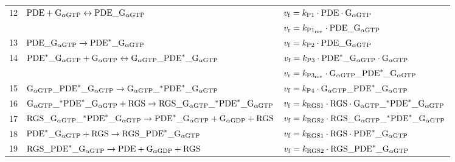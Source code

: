 \documentclass[a4paper, 12pt]{book}
\begin{document}
\begin{table}[H]
\begin{tabular}{c | l | l}
\hline
12 & ${\rm PDE} + {\rm G}_{\alpha{\rm GTP}} \leftrightarrow {\rm PDE}\_{\rm G}_{\alpha{\rm GTP}}$ & $v_{\rm f} = k_{\rm P1} \cdot {\rm PDE} \cdot {\rm G}_{\alpha{\rm GTP}}$\\
 & & $v_{\rm r} = k_{\rm P1_{rev}} \cdot {\rm PDE}\_{\rm G}_{\alpha{\rm GTP}} $\\
\hline
13 & $ {\rm PDE}\_{\rm G}_{\alpha{\rm GTP}} \rightarrow {\rm PDE}^{*}\_{\rm G}_{\alpha{\rm GTP}} $ & $v_{\rm f} =  k_{\rm P2} \cdot {\rm PDE}\_{\rm G}_{\alpha{\rm GTP}}$\\
\hline
14 & $ {\rm PDE}^{*}\_{\rm G}_{\alpha{\rm GTP}} + {\rm G}_{\alpha{\rm GTP}} \leftrightarrow {\rm G}_{\alpha{\rm GTP}}\_{\rm PDE}^{*}\_{\rm G}_{\alpha{\rm GTP}}$ & $v_{\rm f} =  k_{\rm P3} \cdot {\rm PDE}^{*}\_{\rm G}_{\alpha{\rm GTP}} \cdot {\rm G}_{\alpha{\rm GTP}} $\\
 & & $v_{\rm r} = k_{\rm P3_{rev}} \cdot {\rm G}_{\alpha{\rm GTP}}\_{\rm PDE}^{*}\_{\rm G}_{\alpha{\rm GTP}} $\\
\hline
15 & $ {\rm G}_{\alpha{\rm GTP}}\_{\rm PDE}^{*}\_{\rm G}_{\alpha{\rm GTP}} \rightarrow {\rm G}_{\alpha{\rm GTP}}\_{\rm {}^{*} PDE}^{*}\_{\rm G}_{\alpha{\rm GTP}}$ & $v_{\rm f} =  k_{\rm P4} \cdot {\rm G}_{\alpha{\rm GTP}}\_{\rm PDE}^{*}\_{\rm G}_{\alpha{\rm GTP}} $\\
\hline
16 & ${\rm G}_{\alpha{\rm GTP}}\_{\rm {}^{*} PDE}^{*}\_{\rm G}_{\alpha{\rm GTP}} + {\rm RGS} \rightarrow {\rm RGS}\_{\rm G}_{\alpha{\rm GTP}}\_{\rm {}^{*} PDE}^{*}\_{\rm G}_{\alpha{\rm GTP}}$ & $v_{\rm f} =  k_{\rm RGS1} \cdot {\rm RGS} \cdot {\rm G}_{\alpha{\rm GTP}}\_{\rm {}^{*} PDE}^{*}\_{\rm G}_{\alpha{\rm GTP}} $\\
\hline
17 & ${\rm RGS}\_{\rm G}_{\alpha{\rm GTP}}\_{\rm {}^{*} PDE}^{*}\_{\rm G}_{\alpha{\rm GTP}} \rightarrow {\rm PDE}^{*}\_{\rm G}_{\alpha{\rm GTP}} + {\rm G}_{\alpha{\rm GDP}} + {\rm RGS} $ & $v_{\rm f} =  k_{\rm RGS2} \cdot {\rm RGS}\_{\rm G}_{\alpha{\rm GTP}}\_{\rm {}^{*} PDE}^{*}\_{\rm G}_{\alpha{\rm GTP}} $\\
\hline
18 & ${\rm PDE}^{*}\_{\rm G}_{\alpha{\rm GTP}} + {\rm RGS} \rightarrow {\rm RGS}\_{\rm PDE}^{*}\_{\rm G}_{\alpha{\rm GTP}}$ & $v_{\rm f} =  k_{\rm RGS1} \cdot {\rm RGS} \cdot {\rm PDE}^{*}\_{\rm G}_{\alpha{\rm GTP}} $\\
\hline
19 & ${\rm RGS}\_{\rm PDE}^{*}\_{\rm G}_{\alpha{\rm GTP}} \rightarrow {\rm PDE} + {\rm G}_{\alpha{\rm GDP}} + {\rm RGS} $ & $v_{\rm f} =  k_{\rm RGS2} \cdot {\rm RGS}\_{\rm PDE}^{*}\_{\rm G}_{\alpha{\rm GTP}} $\\

\end{tabular}
\end{table}
\end{document}
